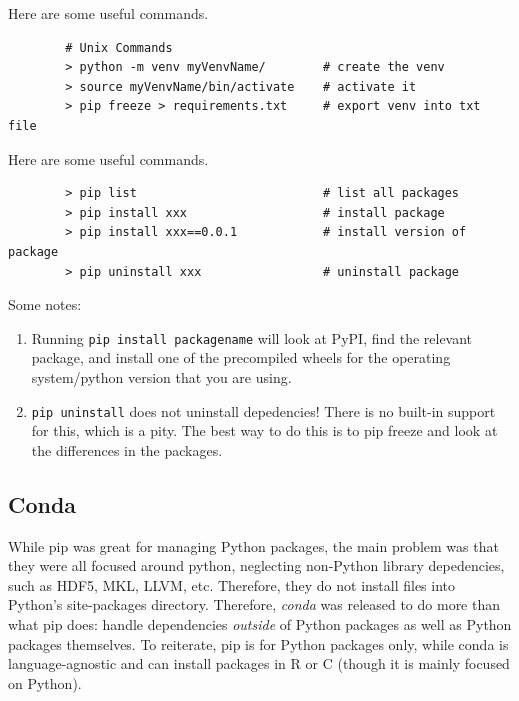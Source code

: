 \documentclass{article}
\begin{document}
    \begin{example}
      Here are some useful commands. 
      \begin{lstlisting}
        # Unix Commands
        > python -m venv myVenvName/        # create the venv
        > source myVenvName/bin/activate    # activate it  
        > pip freeze > requirements.txt     # export venv into txt file 
      \end{lstlisting}
    \end{example}

    \begin{example}
      Here are some useful commands. 
      \begin{lstlisting}
        > pip list                          # list all packages  
        > pip install xxx                   # install package
        > pip install xxx==0.0.1            # install version of package 
        > pip uninstall xxx                 # uninstall package
      \end{lstlisting} 
      Some notes: 
      \begin{enumerate}
        \item Running \texttt{pip install packagename} will look at PyPI, find the relevant package, and install one of the precompiled wheels for the operating system/python version that you are using.  
        \item \texttt{pip uninstall} does not uninstall depedencies! There is no built-in support for this, which is a pity. The best way to do this is to pip freeze and look at the differences in the packages. 
      \end{enumerate}
    \end{example}
    
  \subsection{Conda}

    While pip was great for managing Python packages, the main problem was that they were all focused around python, neglecting non-Python library depedencies, such as HDF5, MKL, LLVM, etc. Therefore, they do not install files into Python's site-packages directory. Therefore, \textit{conda} was released to do more than what pip does: handle dependencies \textit{outside} of Python packages as well as Python packages themselves. To reiterate, pip is for Python packages only, while conda is language-agnostic and can install packages in R or C (though it is mainly focused on Python). 
\end{document}
